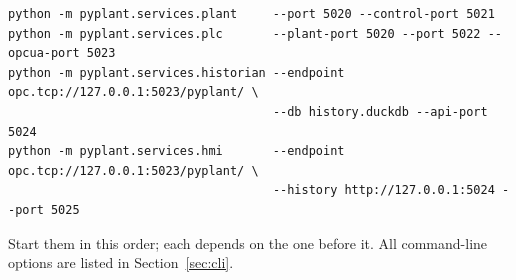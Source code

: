 \begin{lstlisting}[style=sh]
python -m pyplant.services.plant     --port 5020 --control-port 5021
python -m pyplant.services.plc       --plant-port 5020 --port 5022 --opcua-port 5023
python -m pyplant.services.historian --endpoint opc.tcp://127.0.0.1:5023/pyplant/ \
                                     --db history.duckdb --api-port 5024
python -m pyplant.services.hmi       --endpoint opc.tcp://127.0.0.1:5023/pyplant/ \
                                     --history http://127.0.0.1:5024 --port 5025
\end{lstlisting}

Start them in this order; each depends on the one before it. All command-line
options are listed in Section~\ref{sec:cli}.
